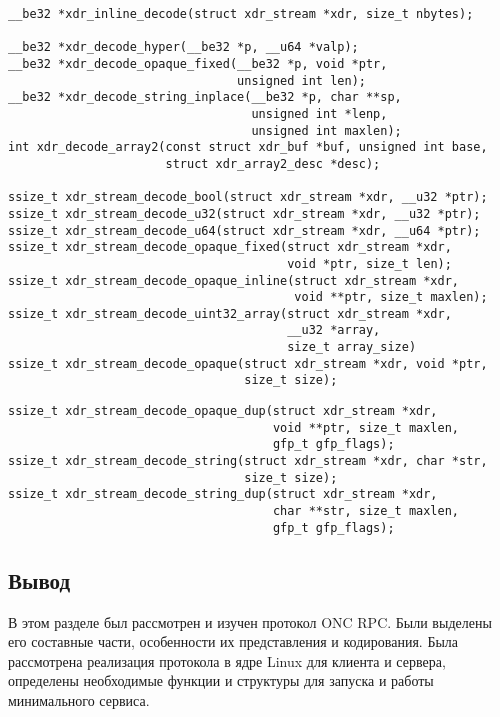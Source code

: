 \begin{lstlisting}[caption={Функции для декодирования (часть 1)}, label={lst:xdr_decode1}]
__be32 *xdr_inline_decode(struct xdr_stream *xdr, size_t nbytes);

__be32 *xdr_decode_hyper(__be32 *p, __u64 *valp);
__be32 *xdr_decode_opaque_fixed(__be32 *p, void *ptr,
                                unsigned int len);
__be32 *xdr_decode_string_inplace(__be32 *p, char **sp,
                                  unsigned int *lenp,
                                  unsigned int maxlen);
int xdr_decode_array2(const struct xdr_buf *buf, unsigned int base,
                      struct xdr_array2_desc *desc);

ssize_t xdr_stream_decode_bool(struct xdr_stream *xdr, __u32 *ptr);
ssize_t xdr_stream_decode_u32(struct xdr_stream *xdr, __u32 *ptr);
ssize_t xdr_stream_decode_u64(struct xdr_stream *xdr, __u64 *ptr);
ssize_t xdr_stream_decode_opaque_fixed(struct xdr_stream *xdr,
                                       void *ptr, size_t len);
ssize_t xdr_stream_decode_opaque_inline(struct xdr_stream *xdr,
                                        void **ptr, size_t maxlen);
ssize_t xdr_stream_decode_uint32_array(struct xdr_stream *xdr,
                                       __u32 *array,
                                       size_t array_size)
ssize_t xdr_stream_decode_opaque(struct xdr_stream *xdr, void *ptr,
                                 size_t size);
\end{lstlisting}
\begin{lstlisting}[caption={Функции для декодирования (часть 2)}, label={lst:xdr_decode2}]
ssize_t xdr_stream_decode_opaque_dup(struct xdr_stream *xdr,
                                     void **ptr, size_t maxlen,
                                     gfp_t gfp_flags);
ssize_t xdr_stream_decode_string(struct xdr_stream *xdr, char *str,
                                 size_t size);
ssize_t xdr_stream_decode_string_dup(struct xdr_stream *xdr,
                                     char **str, size_t maxlen,
                                     gfp_t gfp_flags);
\end{lstlisting}

\subsection*{Вывод}

В этом разделе был рассмотрен и изучен протокол ONC RPC. Были выделены его
составные части, особенности их представления и кодирования. Была рассмотрена
реализация протокола в ядре Linux для клиента и сервера, определены необходимые
функции и структуры для запуска и работы минимального сервиса.

